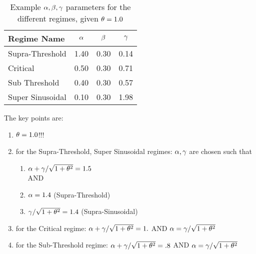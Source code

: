 \documentclass{article}
\begin{document}
\begin{table}[ht]
\begin{center}
\begin{tabular}{l|ccc}
Regime Name & ${\alpha}$ & ${\beta}$ & ${\gamma }$ \\ \hline
Supra-Threshold&1.40&0.30&0.14 \\
Critical&0.50&0.30&0.71 \\
Sub Threshold&0.40&0.30&0.57 \\
Super Sinusoidal&0.10&0.30&1.98 \\
\end{tabular}
\caption{Example ${{\alpha},{\beta},{\gamma } }$ parameters for the different regimes, given ${\theta} = 1.0$}
\label{tab:regimes}
\end{center}
\end{table}

The key points are:
\begin{enumerate}
  \item ${\theta} = 1.0$!!!
  \item for the Supra-Threshold, Super Sinusoidal regimes: ${\alpha}, {\gamma }$ are chosen
  such that
  \begin{enumerate}
  	\item  ${\alpha} + {\gamma } / \sqrt{1 + {\theta}^2} = 1.5$ \\
  	AND
  	\item  ${\alpha} = 1.4 $ (Supra-Threshold)
  	\item ${\gamma } / \sqrt{1 + {\theta}^2} = 1.4 $ (Supra-Sinusoidal)
\end{enumerate}
	\item for the Critical regime: ${\alpha} + {\gamma } / \sqrt{1 + {\theta}^2} = 1.$ AND  ${\alpha} = {\gamma }
	/ \sqrt{1 + {\theta}^2}$
	\item for the Sub-Threshold regime: ${\alpha} + {\gamma } / \sqrt{1 + {\theta}^2} = .8$ AND  ${\alpha}
	= {\gamma } / \sqrt{1 + {\theta}^2}$
\end{enumerate}

 
\end{document}
